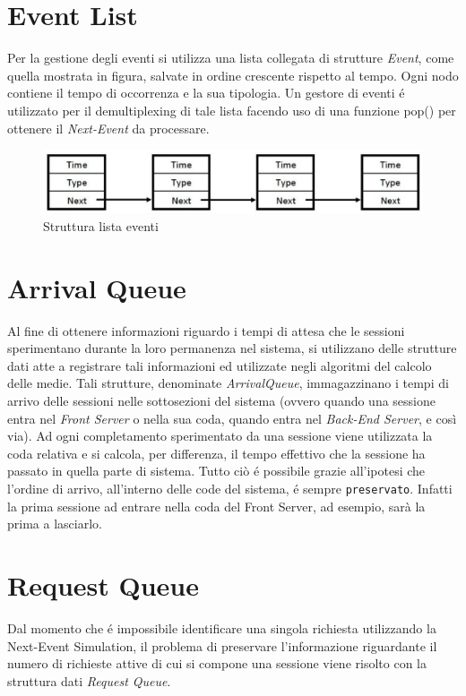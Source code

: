 \section{Event List}
Per la gestione degli eventi si utilizza una lista collegata di strutture 
\textit{Event}, come quella mostrata in figura, salvate in ordine crescente 
rispetto al tempo. Ogni nodo contiene il tempo di occorrenza e la sua tipologia. 
Un gestore di eventi \'e utilizzato per il demultiplexing di tale lista facendo 
uso di una funzione pop() per ottenere il \textit{Next-Event} da processare.
\begin{figure}[H]
  \centering
  \includegraphics[scale=0.5]{img/EventList.png}
  \caption[EventList]{Struttura lista eventi}
  \label{fig:eventList}
\end{figure}

\section{Arrival Queue}
Al fine di ottenere informazioni riguardo i tempi di attesa che le sessioni 
sperimentano durante la loro permanenza nel sistema, si utilizzano delle 
strutture dati atte a registrare tali informazioni ed utilizzate negli algoritmi 
del calcolo delle medie. Tali strutture, denominate \textit{ArrivalQueue}, 
immagazzinano i tempi di arrivo delle sessioni nelle sottosezioni del sistema 
(ovvero quando una sessione entra nel \textit{Front Server} o nella sua coda, 
quando entra nel \textit{Back-End Server}, e cos\`i via). Ad ogni completamento 
sperimentato da una sessione viene utilizzata la coda relativa e si calcola, per 
differenza, il tempo effettivo che la sessione ha passato in quella parte di 
sistema. Tutto ciò \'e possibile grazie all'ipotesi che l'ordine di arrivo, 
all'interno delle code del sistema, \'e sempre \texttt{preservato}. Infatti la 
prima sessione ad entrare nella coda del Front Server, ad esempio, sar\`a la 
prima a lasciarlo.

\section{Request Queue}
Dal momento che \'e impossibile identificare una singola richiesta utilizzando 
la Next-Event Simulation, il problema di preservare l'informazione riguardante 
il numero di richieste attive di cui si compone una sessione viene risolto con 
la struttura dati \textit{Request Queue}. 

